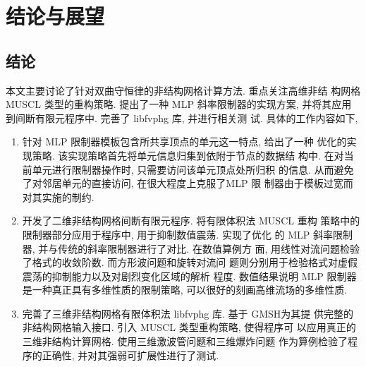 
\chapter{结论与展望}
\label{chap:summ-expec}

\section{结论}
\label{sec:jielun}

本文主要讨论了针对双曲守恒律的非结构网格计算方法. 重点关注高维非结
构网格 MUSCL 类型的重构策略. 提出了一种 MLP 斜率限制器的实现方案,
并将其应用到间断有限元程序中. 完善了 libfvphg 库, 并进行相关测
试. 具体的工作内容如下,


\begin{enumerate}
\item 针对 MLP 限制器模板包含所共享顶点的单元这一特点, 给出了一种
  优化的实现策略. 该实现策略首先将单元信息归集到依附于节点的数据结
  构中. 在对当前单元进行限制器操作时, 只需要访问该单元顶点处所归积
  的信息. 从而避免了对邻居单元的直接访问, 在很大程度上克服了MLP 限
  制器由于模板过宽而对其实施的制约.
\item 开发了二维非结构网格间断有限元程序. 将有限体积法 MUSCL 重构
  策略中的限制器部分应用于程序中, 用于抑制数值震荡. 实现了优化
  的 MLP 斜率限制器, 并与传统的斜率限制器进行了对比. 在数值算例方
  面, 用线性对流问题检验了格式的收敛阶数. 而方形波问题和旋转对流问
  题则分别用于检验格式对虚假震荡的抑制能力以及对剧烈变化区域的解析
 程度. 数值结果说明 MLP 限制器是一种真正具有多维性质的限制策略,
  可以很好的刻画高维流场的多维性质.
\item 完善了三维非结构网格有限体积法 libfvphg 库. 基于 GMSH为其提
  供完整的非结构网格输入接口. 引入 MUSCL 类型重构策略, 使得程序可
  以应用真正的三维非结构计算网格. 使用三维激波管问题和三维爆炸问题
  作为算例检验了程序的正确性, 并对其强弱可扩展性进行了测试.
\end{enumerate}

